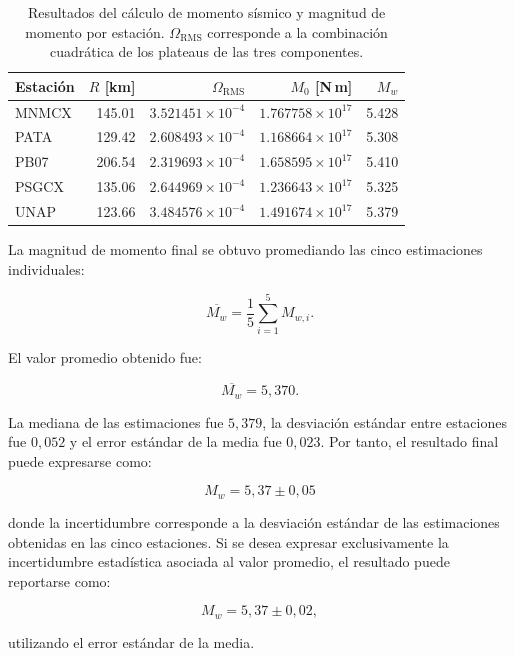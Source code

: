 \documentclass[a4paper,12pt]{article} %
\numberwithin{equation}{section} %
\numberwithin{figure}{section} %
\begin{document}
\begin{table}[]
    \centering
    \caption{Resultados del cálculo de momento sísmico y magnitud de momento por estación. \(\Omega_{\mathrm{RMS}}\) corresponde a la combinación cuadrática de los plateaus de las tres componentes.}
    \label{tab:momento-mw-estaciones}
    \begin{tabular}{l r r r r}
        \hline
        Estación & $R$ [km] & $\Omega_{\mathrm{RMS}}$ &
        $M_0$ [N\,m] & $M_w$ \\
        \hline
        MNMCX & 145.01 & $3.521451\times10^{-4}$ & $1.767758\times10^{17}$ & 5.428 \\
        PATA  & 129.42 & $2.608493\times10^{-4}$ & $1.168664\times10^{17}$ & 5.308 \\
        PB07  & 206.54 & $2.319693\times10^{-4}$ & $1.658595\times10^{17}$ & 5.410 \\
        PSGCX & 135.06 & $2.644969\times10^{-4}$ & $1.236643\times10^{17}$ & 5.325 \\
        UNAP  & 123.66 & $3.484576\times10^{-4}$ & $1.491674\times10^{17}$ & 5.379 \\
        \hline
    \end{tabular}
\end{table}

La magnitud de momento final se obtuvo promediando las cinco estimaciones individuales:

\[
\overline{M_w} =
\frac{1}{5}
\sum_{i=1}^{5}M_{w,i}.
\]

El valor promedio obtenido fue:

\[
\overline{M_w} = 5{,}370.
\]

La mediana de las estimaciones fue \(5{,}379\), la desviación estándar entre estaciones fue \(0{,}052\) y el error estándar de la media fue \(0{,}023\). Por tanto, el resultado final puede expresarse como:

\[
\boxed{
M_w = 5{,}37 \pm 0{,}05
}
\]

donde la incertidumbre corresponde a la desviación estándar de las estimaciones obtenidas en las cinco estaciones. Si se desea expresar exclusivamente la incertidumbre estadística asociada al valor promedio, el resultado puede reportarse como:

\[
M_w = 5{,}37 \pm 0{,}02,
\]

utilizando el error estándar de la media.

\vspace{1cm}
\end{document}
